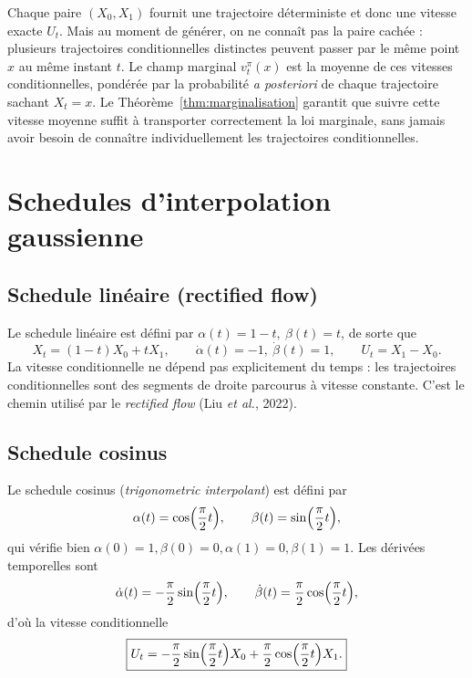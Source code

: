\documentclass[11pt,a4paper]{article}
\theoremstyle{definition}
\theoremstyle{plain}
\theoremstyle{remark}
\begin{document}
\begin{intuitionbox}
Chaque paire $(X_0,X_1)$ fournit une trajectoire déterministe et donc une
vitesse exacte $U_t$. Mais au moment de générer, on ne connaît pas la paire
cachée : plusieurs trajectoires conditionnelles distinctes peuvent passer par le
même point $x$ au même instant $t$. Le champ marginal $v_t^\pi(x)$ est la
moyenne de ces vitesses conditionnelles, pondérée par la probabilité \emph{a
posteriori} de chaque trajectoire sachant $X_t=x$. Le Théorème~\ref{thm:marginalisation}
garantit que suivre cette vitesse moyenne suffit à transporter correctement la
loi marginale, sans jamais avoir besoin de connaître individuellement les
trajectoires conditionnelles.
\end{intuitionbox}

\section{Schedules d'interpolation gaussienne}

\subsection{Schedule linéaire (rectified flow)}

Le schedule linéaire est défini par $\alpha(t)=1-t,\ \beta(t)=t$, de sorte que
\[
  X_t=(1-t)X_0+tX_1,
  \qquad
  \dot\alpha(t)=-1,\ \dot\beta(t)=1,
  \qquad
  U_t = X_1-X_0.
\]
La vitesse conditionnelle ne dépend pas explicitement du temps : les
trajectoires conditionnelles sont des segments de droite parcourus à vitesse
constante. C'est le chemin utilisé par le \emph{rectified flow} (Liu \emph{et
al.}, 2022).

\subsection{Schedule cosinus}

Le schedule cosinus (\emph{trigonometric interpolant}) est défini par
\[
  \alpha(t)=\cos\Bigl(\frac{\pi}{2}t\Bigr),
  \qquad
  \beta(t)=\sin\Bigl(\frac{\pi}{2}t\Bigr),
\]
qui vérifie bien $\alpha(0)=1,\beta(0)=0,\alpha(1)=0,\beta(1)=1$. Les dérivées
temporelles sont
\[
  \dot\alpha(t)=-\frac{\pi}{2}\sin\Bigl(\frac{\pi}{2}t\Bigr),
  \qquad
  \dot\beta(t)=\frac{\pi}{2}\cos\Bigl(\frac{\pi}{2}t\Bigr),
\]
d'où la vitesse conditionnelle
\[
  \boxed{
  U_t = -\frac{\pi}{2}\sin\Bigl(\frac{\pi}{2}t\Bigr)X_0 + \frac{\pi}{2}\cos\Bigl(\frac{\pi}{2}t\Bigr)X_1.
  }
\]
\end{document}
